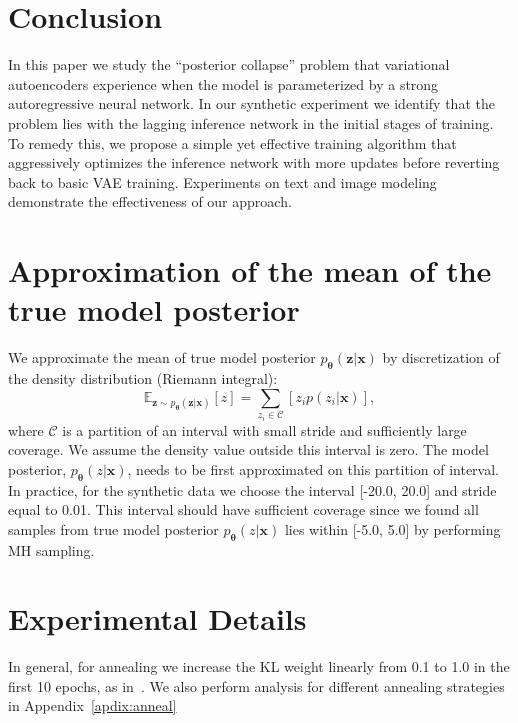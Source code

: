 \documentclass{article} \usepackage{iclr2019_conference,times}
\def\rvx{{\mathbf{x}}}
\def\rvz{{\mathbf{z}}}
\def\vtheta{{\bm{\theta}}}
\def\gC{{\mathcal{C}}}
\newcommand{\E}{\mathbb{E}}
\newcommand{\Epz}{\E_{\rvz\sim p_{\vtheta}(\rvz|\rvx)}}
\newcommand{\pzx}{p_{\vtheta}(\rvz|\rvx)}
\newcommand{\x}{\rvx}
\begin{document}
\section{Conclusion}
In this paper we study the ``posterior collapse'' problem that variational autoencoders experience when the model is parameterized by a strong autoregressive neural network. In our synthetic experiment we identify that the problem lies with the lagging inference network in the initial stages of training. To remedy this, we propose a simple yet effective training algorithm that aggressively optimizes the inference network with more updates before reverting back to basic VAE training. Experiments on text and image modeling demonstrate the effectiveness of our approach.



\newpage
\appendix
\section{Approximation of the mean of the true model posterior}\label{apdix:mean}
We approximate the mean of true model posterior $\pzx$ by discretization of the density distribution (Riemann integral):
 \begin{equation}
 \Epz[z] = \sum_{z_i \in \gC}[z_ip(z_i|\x)],
 \end{equation}
 where $\gC$ is a partition of an interval with small stride and sufficiently large coverage. We assume the density value outside this interval is zero. The model posterior, $p_{\vtheta}(z | \x)$, needs to be first approximated on this partition of interval. In practice, for the synthetic data we choose the interval [-20.0, 20.0] and stride equal to 0.01. This interval should have sufficient coverage since we found all samples from true model posterior $p_{\vtheta}(z | \x)$ lies within [-5.0, 5.0] by performing MH sampling.

\section{Experimental Details}
In general, for annealing we increase the KL weight linearly from 0.1 to 1.0 in the first 10 epochs, as in~\citet{kim2018semi}. We also perform analysis for different annealing strategies in Appendix~\ref{apdix:anneal}
\end{document}
